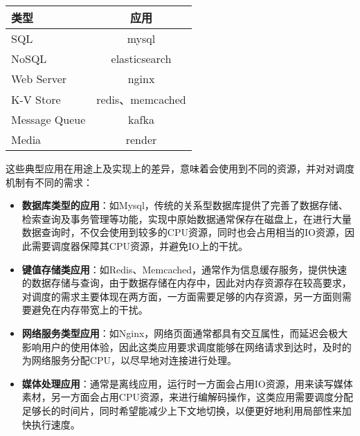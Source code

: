 \begin{table}
    \label{tab:typical_application}
    \footnotesize%
    \setlength{\tabcolsep}{4pt}%
    \renewcommand{\arraystretch}{1.25}%
    \centering
    \begin{tabular}{lc}
        \hline
        类型 & 应用\\
        \hline
        SQL & mysql\\
        NoSQL & elasticsearch\\
        Web Server & nginx\\
        K-V Store & redis、memcached\\
        Message Queue & kafka\\
        Media & render\\
        \hline
    \end{tabular}
\end{table}

这些典型应用在用途上及实现上的差异，意味着会使用到不同的资源，并对对调度机制有不同的需求：

\begin{itemize}
    \item \textbf{数据库类型的应用}：如Mysql，传统的关系型数据库提供了完善了数据存储、检索查询及事务管理等功能，实现中原始数据通常保存在磁盘上，在进行大量数据查询时，不仅会使用到较多的CPU资源，同时也会占用相当的IO资源，因此需要调度器保障其CPU资源，并避免IO上的干扰。
    \item \textbf{键值存储类应用}：如Redis、Memcached，通常作为信息缓存服务，提供快速的数据存储与查询，由于数据存储在内存中，因此对内存资源存在较高要求，对调度的需求主要体现在两方面，一方面需要足够的内存资源，另一方面则需要避免在内存带宽上的干扰。
    \item \textbf{网络服务类型应用}：如Nginx，网络页面通常都具有交互属性，而延迟会极大影响用户的使用体验，因此这类应用要求调度能够在网络请求到达时，及时的为网络服务分配CPU，以尽早地对连接进行处理。
    \item \textbf{媒体处理应用}：通常是离线应用，运行时一方面会占用IO资源，用来读写媒体素材，另一方面会占用CPU资源，来进行编解码操作，这类应用需要调度分配足够长的时间片，同时希望能减少上下文地切换，以便更好地利用局部性来加快执行速度。
\end{itemize}

